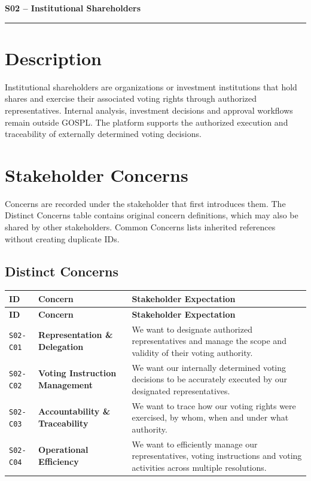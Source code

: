 \documentclass[11pt,a4paper]{article}
\begin{document}

{\LARGE\bfseries S02 -- Institutional Shareholders\par}\vspace{1em}
\noindent\rule{\linewidth}{0.4pt}

\section*{Description}

Institutional shareholders are organizations or investment institutions that hold shares and exercise their associated voting rights through authorized representatives. Internal analysis, investment decisions and approval workflows remain outside GOSPL. The platform supports the authorized execution and traceability of externally determined voting decisions.

\section*{Stakeholder Concerns}

Concerns are recorded under the stakeholder that first introduces them. The Distinct Concerns table contains original concern definitions, which may also be shared by other stakeholders. Common Concerns lists inherited references without creating duplicate IDs.

\subsection*{Distinct Concerns}

\begingroup\small
\begin{longtable}{@{}>{\raggedright\arraybackslash}p{}>{\raggedright\arraybackslash}p{}>{\raggedright\arraybackslash}p{}@{}}
\toprule
\textbf{ID} & \textbf{Concern} & \textbf{Stakeholder Expectation} \\
\midrule
\endfirsthead
\toprule
\textbf{ID} & \textbf{Concern} & \textbf{Stakeholder Expectation} \\
\midrule
\endhead
\bottomrule
\endfoot
\texttt{S02-C01} & \textbf{Representation \& Delegation} & We want to designate authorized representatives and manage the scope and validity of their voting authority. \\
\addlinespace
\texttt{S02-C02} & \textbf{Voting Instruction Management} & We want our internally determined voting decisions to be accurately executed by our designated representatives. \\
\addlinespace
\texttt{S02-C03} & \textbf{Accountability \& Traceability} & We want to trace how our voting rights were exercised, by whom, when and under what authority. \\
\addlinespace
\texttt{S02-C04} & \textbf{Operational Efficiency} & We want to efficiently manage our representatives, voting instructions and voting activities across multiple resolutions. \\
\end{longtable}
\endgroup
\end{document}
